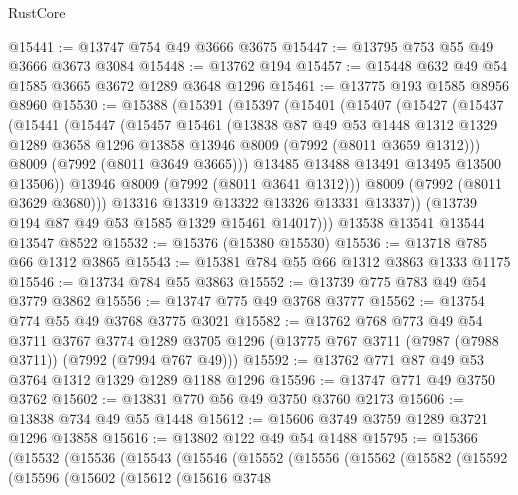 \begin{lexlean}{RustCore}
\begin{coremodule}
@15441 := @13747 @754 @49 @3666 @3675
@15447 := @13795 @753 @55 @49 @3666 @3673 @3084
@15448 := @13762 @194
@15457 := @15448 @632 @49 @54 @1585 @3665 @3672 @1289 @3648 @1296
@15461 := @13775 @193 @1585 @8956 @8960
@15530 := @15388
    (@15391
      (@15397
        (@15401
          (@15407
            (@15427
              (@15437
                (@15441
                  (@15447
                    (@15457
                      @15461
                      (@13838
                        @87
                        @49
                        @53
                        @1448
                        @1312
                        @1329
                        @1289
                        @3658
                        @1296
                        @13858
                        @13946
                        @8009
                        (@7992 (@8011 @3659 @1312)))
                      @8009
                      (@7992 (@8011 @3649 @3665)))
                    @13485
                    @13488
                    @13491
                    @13495
                    @13500
                    @13506))
                @13946
                @8009
                (@7992 (@8011 @3641 @1312)))
              @8009
              (@7992 (@8011 @3629 @3680)))
            @13316
            @13319
            @13322
            @13326
            @13331
            @13337))
        (@13739 @194 @87 @49 @53 @1585 @1329 @15461 @14017)))
    @13538
    @13541
    @13544
    @13547
    @8522
@15532 := @15376 (@15380 @15530)
@15536 := @13718 @785 @66 @1312 @3865
@15543 := @15381 @784 @55 @66 @1312 @3863 @1333 @1175
@15546 := @13734 @784 @55 @3863
@15552 := @13739 @775 @783 @49 @54 @3779 @3862
@15556 := @13747 @775 @49 @3768 @3777
@15562 := @13754 @774 @55 @49 @3768 @3775 @3021
@15582 := @13762
    @768
    @773
    @49
    @54
    @3711
    @3767
    @3774
    @1289
    @3705
    @1296
    (@13775 @767 @3711 (@7987 (@7988 @3711)) (@7992 (@7994 @767 @49)))
@15592 := @13762 @771 @87 @49 @53 @3764 @1312 @1329 @1289 @1188 @1296
@15596 := @13747 @771 @49 @3750 @3762
@15602 := @13831 @770 @56 @49 @3750 @3760 @2173
@15606 := @13838 @734 @49 @55 @1448
@15612 := @15606 @3749 @3759 @1289 @3721 @1296 @13858
@15616 := @13802 @122 @49 @54 @1488
@15795 := @15366
    (@15532
      (@15536
        (@15543
          (@15546
            (@15552
              (@15556
                (@15562
                  (@15582
                    (@15592
                      (@15596
                        (@15602
                          (@15612
                            (@15616
                              @3748

\end{coremodule}
\end{lexlean}
